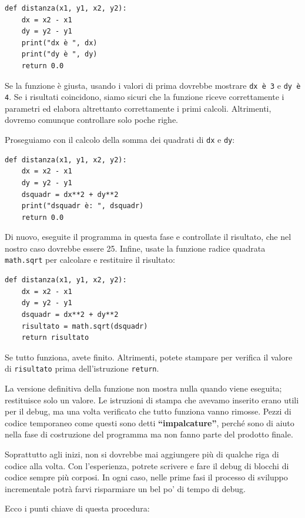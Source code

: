 \documentclass[10pt]{book}
\begin{document}
\begin{verbatim}
def distanza(x1, y1, x2, y2):
    dx = x2 - x1
    dy = y2 - y1
    print("dx è ", dx)
    print("dy è ", dy)
    return 0.0
\end{verbatim}
%
Se la funzione è giusta, usando i valori di prima dovrebbe mostrare \verb"dx è 3" e \verb"dy è 4". Se i risultati coincidono, siamo sicuri che la funzione riceve correttamente i parametri ed elabora altrettanto correttamente i primi calcoli. Altrimenti, dovremo comunque controllare solo poche righe.

Proseguiamo con il calcolo della somma dei quadrati di {\tt dx} e {\tt dy}:

\begin{verbatim}
def distanza(x1, y1, x2, y2):
    dx = x2 - x1
    dy = y2 - y1
    dsquadr = dx**2 + dy**2
    print("dsquadr è: ", dsquadr)
    return 0.0
\end{verbatim}
%
Di nuovo, eseguite il programma in questa fase e controllate il risultato, che nel nostro caso dovrebbe essere 25.
Infine, usate la funzione radice quadrata {\tt math.sqrt} per calcolare e restituire il risultato:

\begin{verbatim}
def distanza(x1, y1, x2, y2):
    dx = x2 - x1
    dy = y2 - y1
    dsquadr = dx**2 + dy**2
    risultato = math.sqrt(dsquadr)
    return risultato
\end{verbatim}
%
Se tutto funziona, avete finito. Altrimenti, potete stampare per verifica il valore di {\tt risultato} prima dell'istruzione {\tt return}.

La versione definitiva della funzione non mostra nulla quando viene eseguita; restituisce solo un valore. Le istruzioni di stampa che avevamo inserito erano utili per il debug, ma una volta verificato che tutto funziona vanno rimosse. Pezzi di codice temporaneo come questi sono detti {\bf ``impalcature''}, perché sono di aiuto nella fase di costruzione del programma ma non fanno parte del prodotto finale. 

Soprattutto agli inizi, non si dovrebbe mai aggiungere più di qualche riga
di codice alla volta. Con l'esperienza, potrete scrivere e fare il debug di blocchi di codice sempre più corposi. In ogni caso, nelle prime fasi il processo di sviluppo incrementale potrà farvi risparmiare un bel po' di tempo di debug.

Ecco i punti chiave di questa procedura:
\end{document}
